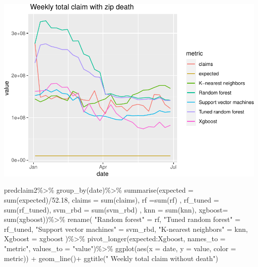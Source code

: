 \documentclass[
]{article}
\newenvironment{Shaded}{\begin{snugshade}}{\end{snugshade}}
\newcommand{\AttributeTok}[1]{\textcolor[rgb]{0.77,0.63,0.00}{#1}}
\newcommand{\FloatTok}[1]{\textcolor[rgb]{0.00,0.00,0.81}{#1}}
\newcommand{\FunctionTok}[1]{\textcolor[rgb]{0.00,0.00,0.00}{#1}}
\newcommand{\NormalTok}[1]{#1}
\newcommand{\OtherTok}[1]{\textcolor[rgb]{0.56,0.35,0.01}{#1}}
\newcommand{\SpecialCharTok}[1]{\textcolor[rgb]{0.00,0.00,0.00}{#1}}
\newcommand{\StringTok}[1]{\textcolor[rgb]{0.31,0.60,0.02}{#1}}
\begin{document}
\includegraphics{figures/report/fig-unnamed-chunk-86-2.pdf}

\begin{Shaded}
\begin{Highlighting}[]
\NormalTok{predclaim2}\SpecialCharTok{\%\textgreater{}\%}
  \FunctionTok{group\_by}\NormalTok{(date)}\SpecialCharTok{\%\textgreater{}\%}
  \FunctionTok{summarise}\NormalTok{(}\AttributeTok{expected =} \FunctionTok{sum}\NormalTok{(expected)}\SpecialCharTok{/}\FloatTok{52.18}\NormalTok{,}
        \AttributeTok{claims =} \FunctionTok{sum}\NormalTok{(claims),}
          \AttributeTok{rf =}\FunctionTok{sum}\NormalTok{(rf) ,}
         \AttributeTok{rf\_tuned =} \FunctionTok{sum}\NormalTok{(rf\_tuned),}
         \AttributeTok{svm\_rbd =} \FunctionTok{sum}\NormalTok{(svm\_rbd) ,}
         \AttributeTok{knn =} \FunctionTok{sum}\NormalTok{(knn),}
         \AttributeTok{xgboost=} \FunctionTok{sum}\NormalTok{(xgboost))}\SpecialCharTok{\%\textgreater{}\%}
   \FunctionTok{rename}\NormalTok{( }\StringTok{"Random forest"} \OtherTok{=}\NormalTok{ rf, }\StringTok{"Tuned random forest"} \OtherTok{=}\NormalTok{ rf\_tuned, }
    \StringTok{"Support vector machines"} \OtherTok{=}\NormalTok{ svm\_rbd, }\StringTok{"K{-}nearest neighbors"} \OtherTok{=}\NormalTok{ knn, }\AttributeTok{Xgboost =}\NormalTok{ xgboost )}\SpecialCharTok{\%\textgreater{}\%}
  \FunctionTok{pivot\_longer}\NormalTok{(expected}\SpecialCharTok{:}\NormalTok{Xgboost, }\AttributeTok{names\_to =} \StringTok{"metric"}\NormalTok{, }\AttributeTok{values\_to =} \StringTok{"value"}\NormalTok{)}\SpecialCharTok{\%\textgreater{}\%}
  \FunctionTok{ggplot}\NormalTok{(}\FunctionTok{aes}\NormalTok{(}\AttributeTok{x =}\NormalTok{ date, }\AttributeTok{y =}\NormalTok{ value, }\AttributeTok{color =}\NormalTok{ metric)) }\SpecialCharTok{+} \FunctionTok{geom\_line}\NormalTok{()}\SpecialCharTok{+}
  \FunctionTok{ggtitle}\NormalTok{(}\StringTok{" Weekly total claim without death"}\NormalTok{)}
\end{Highlighting}
\end{Shaded}
\end{document}
